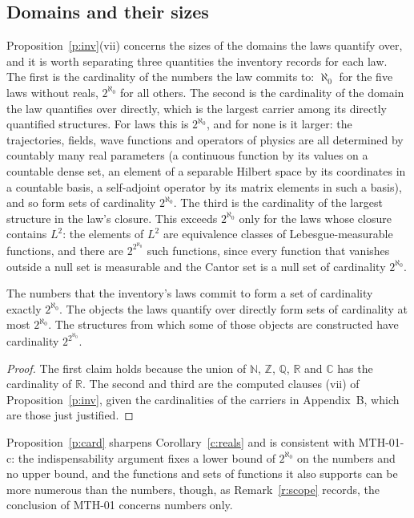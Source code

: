 \documentclass{situationist-preprint}
\begin{document}
\subsection{Domains and their sizes}

Proposition~\ref{p:inv}(vii) concerns the sizes of the domains the laws quantify over, and it is worth separating three quantities the inventory records for each law. The first is the cardinality of the numbers the law commits to: $\aleph_0$ for the five laws without reals, $2^{\aleph_0}$ for all others. The second is the cardinality of the domain the law quantifies over directly, which is the largest carrier among its directly quantified structures. For \nDomC{} laws this is $2^{\aleph_0}$, and for none is it larger: the trajectories, fields, wave functions and operators of physics are all determined by countably many real parameters (a continuous function by its values on a countable dense set, an element of a separable Hilbert space by its coordinates in a countable basis, a self-adjoint operator by its matrix elements in such a basis), and so form sets of cardinality $2^{\aleph_0}$. The third is the cardinality of the largest structure in the law's closure. This exceeds $2^{\aleph_0}$ only for the \nClosTwoC{} laws whose closure contains $L^2$: the elements of $L^2$ are equivalence classes of Lebesgue-measurable functions, and there are $2^{2^{\aleph_0}}$ such functions, since every function that vanishes outside a null set is measurable and the Cantor set is a null set of cardinality $2^{\aleph_0}$.

\begin{proposition}\label{p:card}
The numbers that the inventory's laws commit to form a set of cardinality exactly $2^{\aleph_0}$. The objects the laws quantify over directly form sets of cardinality at most $2^{\aleph_0}$. The structures from which some of those objects are constructed have cardinality $2^{2^{\aleph_0}}$.
\end{proposition}

\begin{proof}
The first claim holds because the union of $\mathbb N$, $\mathbb Z$, $\mathbb Q$, $\mathbb R$ and $\mathbb C$ has the cardinality of $\mathbb R$. The second and third are the computed clauses (vii) of Proposition~\ref{p:inv}, given the cardinalities of the carriers in Appendix~B, which are those just justified.
\end{proof}

Proposition~\ref{p:card} sharpens Corollary~\ref{c:reals} and is consistent with MTH-01-c: the indispensability argument fixes a lower bound of $2^{\aleph_0}$ on the numbers and no upper bound, and the functions and sets of functions it also supports can be more numerous than the numbers, though, as Remark~\ref{r:scope} records, the conclusion of MTH-01 concerns numbers only.
\end{document}
